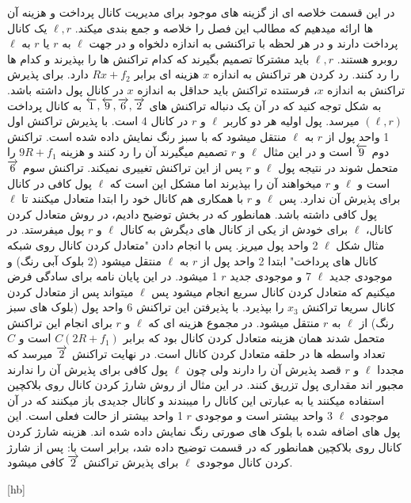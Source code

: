  در این قسمت خلاصه ای از گزینه های موجود برای مدیریت کانال پرداخت و هزینه آن ها ارائه میدهیم که مطالب این فصل را خلاصه و جمع بندی میکند.
$\ell , r$
یک کانال پرداخت دارند و در هر لحظه با تراکنشی به اندازه دلخواه و در جهت $\ell$ به $r$ یا $r$ به $\ell$ روبرو هستند.
$\ell , r$ 
باید مشترکا تصمیم بگیرند که کدام تراکنش ها را بپذیرند و کدام ها را رد کنند. رد کردن هر تراکنش به اندازه $x$ هزینه ای برابر 
$Rx+f_2$
دارد. برای پذیرش تراکنش به اندازه $x$، فرستنده تراکنش باید حداقل به اندازه $x$ در کانال پول داشته باشد. به شکل  توجه کنید که در آن یک دنباله تراکنش های  
$\overleftarrow{1},\overleftarrow{9},\overrightarrow{6},\overrightarrow{2}$
به کانال پرداخت 
$(\ell,r)$
میرسد. پول اولیه هر دو کاربر 
$\ell$ و $r$
در کانال 4 است. با پذیرش تراکنش اول 1 واحد پول از $r$ به $\ell$ منتقل میشود که با سبز رنگ نمایش داده شده است.
تراکنش دوم
$\overleftarrow{9}$
است و در این مثال 
$\ell$ و $r$ 
تصمیم میگیرند آن را رد کنند و هزینه 
$9R+f_1$
را متحمل شوند در نتیجه پول $\ell$ و $r$ پس از این تراکنش تغییری نمیکند.
 تراکنش سوم
$\overrightarrow{6}$
 است و 
$\ell$ و $r$ 
میخواهند آن را بپذیرند اما مشکل این است که $\ell$ پول کافی در کانال برای پذیرش آن ندارد. پس 
$\ell$ و $r$ 
با همکاری هم کانال خود را ابتدا متعادل میکنند تا $\ell$ پول کافی داشته باشد. همانطور که در بخش  توضیح دادیم، در روش متعادل کردن کانال، $\ell$ برای خودش از یکی از کانال های دیگرش به کانال 
$\ell$ و $r$ 
پول میفرستد. در مثال شکل  $\ell$ 2 واحد پول میریز. پس با انجام دادن "متعادل کردن کانال روی شبکه کانال های پرداخت" ابتدا 2 واحد پول از $r$ به $\ell$ منتقل میشود (2 بلوک آبی رنگ) و موجودی جدید $\ell$ 
7  و موجودی جدید $r$ 
1 میشود. در این پایان نامه برای سادگی فرض میکنیم که متعادل کردن کانال سریع انجام میشود پس $\ell$ میتواند پس از متعادل کردن کانال سریعا تراکنش 
$x_3$
را بپذیرد. با پذیرفتن این تراکنش 6 واحد پول (بلوک های سبز رنگ) از $\ell$ به $r$ منتقل میشود. در مجموع هزینه ای که $\ell$ و $r$ برای انجام این تراکنش متحمل شدند همان هزینه متعادل کردن کانال بود که برابر 
$C(2R+f_1)$
است و $C$ تعداد واسطه ها در حلقه متعادل کردن کانال است.
در نهایت تراکنش 
$\overrightarrow{2}$
میرسد که مجددا 
$\ell$ و $r$  
قصد پذیرش آن را دارند ولی چون $\ell$ پول کافی برای پذیرش آن را ندارند مجبور اند مقداری پول تزریق کنند. در این مثال از روش شارژ کردن کانال روی بلاکچین استفاده میکنند یا به عبارتی این کانال را میبندند و کانال جدیدی باز میکنند که در آن موجودی $\ell$ 
3 واحد بیشتر است و موجودی $r$
1 واحد بیشتر از حالت فعلی است. این پول های اضافه شده با بلوک های صورتی رنگ نمایش داده شده اند. هزینه شارژ کردن کانال روی بلاکچین همانطور که در قسمت  توضیح داده شد، برابر است با:
پس از شارژ کردن کانال موجودی $\ell$ برای پذیرش تراکنش $\overrightarrow{2}$ کافی میشود.



[hb]

